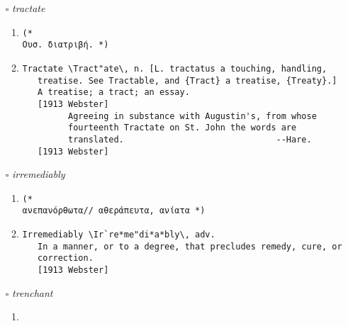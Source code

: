 \documentclass{article}
\begin{document}
\begin{itemize}
\begin{enumerate}
{\begin{lstlisting}
   {Tertiary syphilis} (Med.), the third and last stage of
      syphilis, in which it invades the bones and internal
      organs.
      [1913 Webster]
Tertiary \Ter"ti*a*ry\, n.; pl. {Tertiaries}.
   1. (R. C. Ch.) A member of the Third Order in any monastic
      system; as, the Franciscan tertiaries; the Dominican
      tertiaries; the Carmelite tertiaries. See {Third Order},
      under {Third}. --Addis & Arnold.
      [1913 Webster]
   2. (Geol.) The Tertiary era, period, or formation.
      [1913 Webster]
   3. (Zo["o]l.) One of the quill feathers which are borne upon
      the basal joint of the wing of a bird. See Illust. of
      {Bird}.
      [1913 Webster]
\end{lstlisting}}
\end{enumerate}
\item[$\square$] \emph{ tractate }
\begin{enumerate}
\item{
\begin{lstlisting}
(* 
Ουσ. διατριβή. *)
\end{lstlisting}}
\item{
\begin{lstlisting}
Tractate \Tract"ate\, n. [L. tractatus a touching, handling,
   treatise. See Tractable, and {Tract} a treatise, {Treaty}.]
   A treatise; a tract; an essay.
   [1913 Webster]
         Agreeing in substance with Augustin's, from whose
         fourteenth Tractate on St. John the words are
         translated.                              --Hare.
   [1913 Webster]
\end{lstlisting}}
\end{enumerate}
\item[$\square$] \emph{ irremediably }
\begin{enumerate}
\item{
\begin{lstlisting}
(* 
ανεπανόρθωτα// αθεράπευτα, ανίατα *)
\end{lstlisting}}
\item{
\begin{lstlisting}
Irremediably \Ir`re*me"di*a*bly\, adv.
   In a manner, or to a degree, that precludes remedy, cure, or
   correction.
   [1913 Webster]
\end{lstlisting}}
\end{enumerate}
\item[$\square$] \emph{ trenchant }
\begin{enumerate}
\item{
\begin{lstlisting}

\end{lstlisting}}
\end{enumerate}
\end{itemize}
\end{document}
